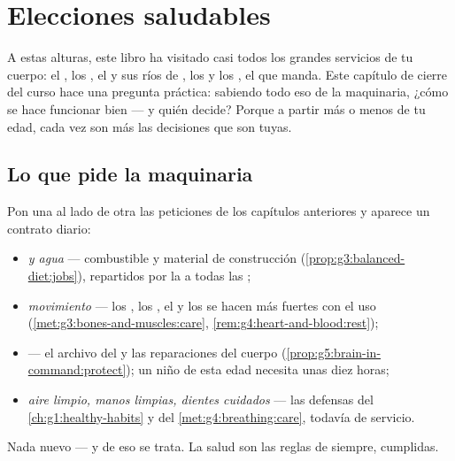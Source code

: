 \chapter{Elecciones saludables}\label{ch:g5:healthy-choices}

A estas alturas, este libro ha visitado casi todos los grandes
servicios de tu cuerpo: el , los , el  y
sus ríos de , los  y los , el  que manda.
Este capítulo de cierre del curso hace una pregunta práctica: sabiendo
todo eso de la maquinaria, ¿cómo se hace funcionar bien --- y quién
decide? Porque a partir más o menos de tu edad, cada vez son más las
decisiones que son tuyas.

\section{Lo que pide la maquinaria}

\begin{proposition}\label{prop:g5:healthy-choices:contract}
Pon una al lado de otra las peticiones de los capítulos anteriores y
aparece un contrato diario:
\begin{itemize}
  \item \emph{ y agua} --- combustible y material de
        construcción (\cref{prop:g3:balanced-diet:jobs}), repartidos
        por la  a todas las ;
  \item \emph{movimiento} --- los , los , el  y
        los  se hacen más fuertes con el uso
        (\cref{met:g3:bones-and-muscles:care},
        \cref{rem:g4:heart-and-blood:rest});
  \item \emph{} --- el archivo del  y las reparaciones del
        cuerpo (\cref{prop:g5:brain-in-command:protect}); un niño de
        esta edad necesita unas diez horas;
  \item \emph{aire limpio, manos limpias, dientes cuidados} --- las
        defensas del \cref{ch:g1:healthy-habits} y del
        \cref{met:g4:breathing:care}, todavía de servicio.
\end{itemize}
Nada nuevo --- y de eso se trata. La salud son las reglas de siempre,
cumplidas.
\end{proposition}
\admitted

